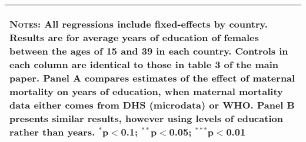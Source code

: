 \begin{landscape}
\begin{table}[htpb!]
\begin{center}
\begin{tabular}{lcccccccc}
\multicolumn{9}{p{20cm}}{\begin{footnotesize}\textsc{Notes:} All regressions include fixed-effects by country.  Results are for average years of education of females between the ages of 15 and 39 in each country.  Controls in each column are identical to those in table 3 of the main paper. Panel A compares estimates of the effect of maternal mortality on years of education, when maternal mortality data either comes from DHS (microdata) or WHO.  Panel B presents similar results, however using levels of education rather than years.
$^{*}$p$<$0.1; $^{**}$p$<$0.05; $^{***}$p$<$0.01\end{footnotesize}} \\ \bottomrule 
\end{tabular}\end{center}\end{table}\end{landscape}
